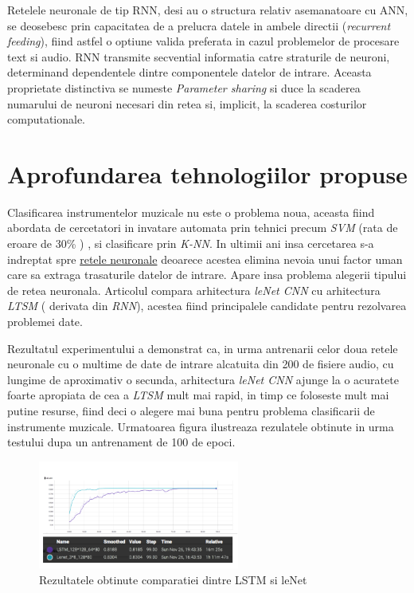 \documentclass[a4paper]{article}
\begin{document}
\begin{itemize}
\begin{figure}[ht]
\end{figure}


Retelele neuronale de tip RNN, desi au o structura relativ asemanatoare cu ANN, se deosebesc prin capacitatea de a prelucra datele
in ambele directii (\textit{recurrent feeding}), fiind astfel o optiune valida preferata in cazul problemelor de procesare text
si audio. RNN transmite secvential informatia catre straturile de neuroni, determinand dependentele dintre componentele datelor
de intrare. Aceasta proprietate distinctiva se numeste \textit{Parameter sharing} si duce la scaderea numarului de neuroni necesari
din retea si, implicit, la scaderea costurilor computationale.

\end{itemize}


 \section {Aprofundarea tehnologiilor propuse }
 Clasificarea instrumentelor muzicale nu este o problema noua, aceasta fiind abordata de cercetatori in
invatare automata prin tehnici precum \textit{SVM} (rata de eroare de 30\% )
, si clasificare prin \textit{K-NN}.
In ultimii ani insa cercetarea s-a indreptat spre \hyperref[NN]{retele neuronale} deoarece acestea elimina nevoia unui factor uman
care sa extraga trasaturile datelor de intrare. Apare insa problema alegerii tipului de retea neuronala. Articolul \cite{DLFMIR}  compara arhitectura \textit{ leNet CNN } cu arhitectura \textit{LTSM} ( derivata din \textit{RNN}), acestea fiind
principalele candidate pentru rezolvarea problemei date.


Rezultatul experimentului a demonstrat ca, in urma antrenarii celor doua retele neuronale cu o multime de date
de intrare alcatuita din 200 de fisiere audio, cu lungime de aproximativ o secunda, arhitectura
\textit{leNet CNN} ajunge la o acuratete foarte apropiata de cea a \textit{LTSM} mult mai rapid, in timp ce
foloseste mult mai putine resurse, fiind deci o alegere mai buna pentru problema clasificarii de instrumente
muzicale. Urmatoarea figura ilustreaza rezulatele obtinute in urma testului dupa un antrenament de 100 de
epoci.

\begin{figure}[H]
	\centering
	\includegraphics[width = 2.6in]{res.png}
	\caption{Rezultatele obtinute comparatiei dintre LSTM si leNet}
\label{result1}
\end{figure}
\end{document}
